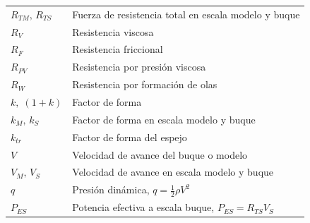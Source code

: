 \begin{longtable}{@{}p{} p{}@{}}
$R_{TM},\,R_{TS}$  & Fuerza de resistencia total en escala modelo y buque \\
$R_V$              & Resistencia viscosa \\
$R_F$              & Resistencia friccional \\
$R_{PV}$           & Resistencia por presión viscosa \\
$R_W$              & Resistencia por formación de olas \\
$k,\;(1+k)$        & Factor de forma \\
$k_M,\,k_S$        & Factor de forma en escala modelo y buque \\
$k_{tr}$           & Factor de forma del espejo \\
$V$                & Velocidad de avance del buque o modelo \\
$V_M,\,V_S$        & Velocidad de avance en escala modelo y buque \\
$q$                & Presión dinámica, $q = \tfrac{1}{2}\rho V^2$ \\
$P_{ES}$           & Potencia efectiva a escala buque, $P_{ES} = R_{TS}V_S$ \\
\end{longtable}

